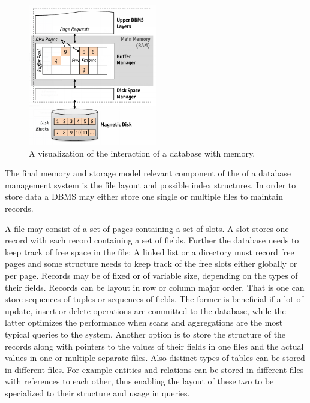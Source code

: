         \begin{figure}[htp]\label{dbms_memory}
            \begin{center}
            \includegraphics[keepaspectratio,height=0.4\textheight,width=0.5\textwidth]{img/00_intro/RDBMS_memory_view.png}
            \end{center}
            \caption{A visualization of the interaction of a database with memory.} %
        \end{figure}

        The final memory and storage model relevant component of the  of a database management system is the file layout and possible index structures. 
        In order to store data a DBMS may either store one single or multiple files to maintain records. 

        A file may consist of a set of pages containing a set of slots. A slot stores one record with each record containing a set of fields. Further the database needs to keep track of free space in the file: A linked list or a directory must record free pages and some structure needs to keep track of the free slots either globally or per page. 
        Records may be of fixed or of variable size, depending on the types of their fields. 
        Records can be layout in row or column major order.
        That is one can store sequences of tuples or sequences of fields.
        The former is beneficial if a lot of update, insert or delete operations are committed to the database, while the latter optimizes the performance when scans and aggregations are the most typical queries to the system.
        Another option is to store the structure of the records along with pointers to the values of their fields in one files and the actual values in one or multiple separate files. 
        Also distinct types of tables can be stored in different files. 
        For example entities and relations can be stored in different files with references to each other, thus enabling the layout of these two to be specialized to their structure and usage in queries.

